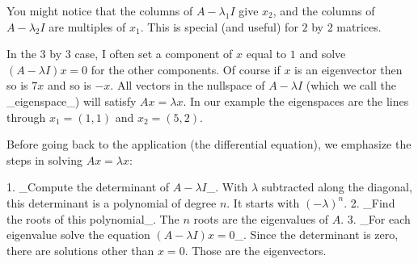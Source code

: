 You might notice that the columns of \(A-\lambda_{1}I\) give \(x_{2}\), and the columns of \(A-\lambda_{2}I\) are multiples of \(x_{1}\). This is special (and useful) for \(2\) by \(2\) matrices.

In the \(3\) by \(3\) case, I often set a component of \(x\) equal to \(1\) and solve \((A-\lambda I)x=0\) for the other components. Of course if \(x\) is an eigenvector then so is \(7x\) and so is \(-x\). All vectors in the nullspace of \(A-\lambda I\) (which we call the _eigenspace_) will satisfy \(Ax=\lambda x\). In our example the eigenspaces are the lines through \(x_{1}=(1,1)\) and \(x_{2}=(5,2)\).

Before going back to the application (the differential equation), we emphasize the steps in solving \(Ax=\lambda x\):

1. _Compute the determinant of \(A-\lambda I\)_. With \(\lambda\) subtracted along the diagonal, this determinant is a polynomial of degree \(n\). It starts with \((-\lambda)^{n}\).
2. _Find the roots of this polynomial_. The \(n\) roots are the eigenvalues of \(A\).
3. _For each eigenvalue solve the equation \((A-\lambda I)x=0\)_. Since the determinant is zero, there are solutions other than \(x=0\). Those are the eigenvectors.

 